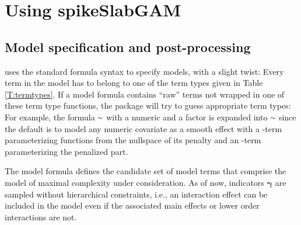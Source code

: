 \documentclass[article, shortnames, nojss, noheadings, notitle]{jss}
\newcommand{\ftilde}{\raise.17ex\hbox{$\scriptstyle\mathtt{\sim}$}}
\begin{document}
\section{Using spikeSlabGAM}\label{using}

\subsection{Model specification and post-processing}\label{specification}
 uses the standard  formula syntax to specify models, with a slight twist:
Every term in the model has to belong to one of the term types given
in Table \ref{T:termtypes}. If a model formula contains ``raw'' terms not wrapped in one of
these term type functions, the package will try to guess appropriate term types: For example, the formula $\ftilde$ with a numeric  and a factor  is expanded
into $\ftilde$ since the default is to model any numeric covariate
as a smooth effect with a -term parameterizing functions from the nullspace of its penalty
and an -term parameterizing the penalized part.

The model formula defines the candidate set of model terms that comprise the
model of maximal complexity under consideration. As of now, indicators $\bm\gamma$ are sampled without hierarchical constraints,
i.e., an interaction effect can be included in the model even if the associated main effects or lower order interactions are not.
\end{document}

